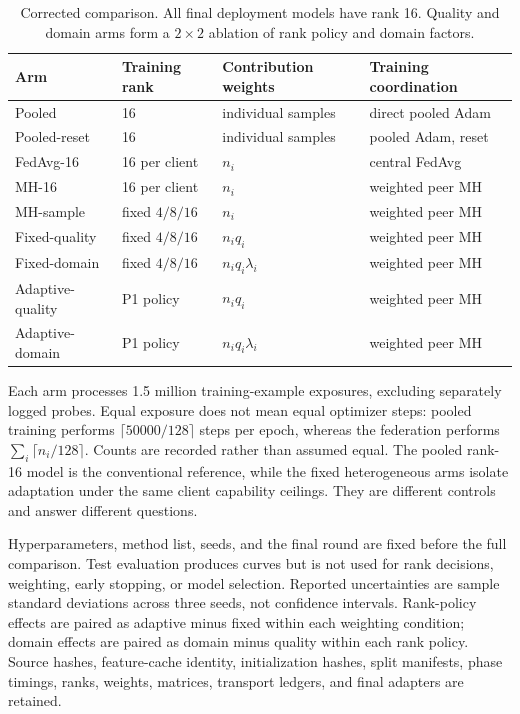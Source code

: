 \documentclass[11pt]{article}
\begin{document}
\begin{table}[t]
\centering
\caption{Corrected comparison. All final deployment models have rank 16. Quality and domain arms form a $2\times2$ ablation of rank policy and domain factors.}
\label{tab:design}
\small
\begin{tabular}{llll}
\toprule
Arm & Training rank & Contribution weights & Training coordination\\
\midrule
Pooled & 16 & individual samples & direct pooled Adam\\
Pooled-reset & 16 & individual samples & pooled Adam, reset\\
FedAvg-16 & 16 per client & $n_i$ & central FedAvg\\
MH-16 & 16 per client & $n_i$ & weighted peer MH\\
MH-sample & fixed $4/8/16$ & $n_i$ & weighted peer MH\\
Fixed-quality & fixed $4/8/16$ & $n_iq_i$ & weighted peer MH\\
Fixed-domain & fixed $4/8/16$ & $n_iq_i\lambda_i$ & weighted peer MH\\
Adaptive-quality & P1 policy & $n_iq_i$ & weighted peer MH\\
Adaptive-domain & P1 policy & $n_iq_i\lambda_i$ & weighted peer MH\\
\bottomrule
\end{tabular}
\end{table}

Each arm processes 1.5 million training-example exposures, excluding separately logged probes. Equal exposure does not mean equal optimizer steps: pooled training performs $\lceil50000/128\rceil$ steps per epoch, whereas the federation performs $\sum_i\lceil n_i/128\rceil$. Counts are recorded rather than assumed equal. The pooled rank-16 model is the conventional reference, while the fixed heterogeneous arms isolate adaptation under the same client capability ceilings. They are different controls and answer different questions.

Hyperparameters, method list, seeds, and the final round are fixed before the full comparison. Test evaluation produces curves but is not used for rank decisions, weighting, early stopping, or model selection. Reported uncertainties are sample standard deviations across three seeds, not confidence intervals. Rank-policy effects are paired as adaptive minus fixed within each weighting condition; domain effects are paired as domain minus quality within each rank policy. Source hashes, feature-cache identity, initialization hashes, split manifests, phase timings, ranks, weights, matrices, transport ledgers, and final adapters are retained.
\end{document}
